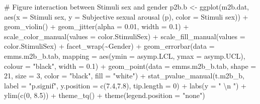 \documentclass[
  bookmarksnumbered]{article}
\newenvironment{Shaded}{\begin{snugshade}}{\end{snugshade}}
\newcommand{\AttributeTok}[1]{\textcolor[rgb]{0.80,0.80,0.80}{#1}}
\newcommand{\CommentTok}[1]{\textcolor[rgb]{0.50,0.62,0.50}{#1}}
\newcommand{\DecValTok}[1]{\textcolor[rgb]{0.86,0.86,0.80}{#1}}
\newcommand{\FloatTok}[1]{\textcolor[rgb]{0.75,0.75,0.82}{#1}}
\newcommand{\FunctionTok}[1]{\textcolor[rgb]{0.94,0.94,0.56}{#1}}
\newcommand{\NormalTok}[1]{\textcolor[rgb]{0.80,0.80,0.80}{#1}}
\newcommand{\OtherTok}[1]{\textcolor[rgb]{0.94,0.94,0.56}{#1}}
\newcommand{\SpecialCharTok}[1]{\textcolor[rgb]{0.86,0.64,0.64}{#1}}
\newcommand{\StringTok}[1]{\textcolor[rgb]{0.80,0.58,0.58}{#1}}
\begin{document}
\begin{Shaded}
\begin{Highlighting}[]
\CommentTok{\# Figure interaction between Stimuli sex and gender}
\NormalTok{p2b.b }\OtherTok{\textless{}{-}} \FunctionTok{ggplot}\NormalTok{(m2b.dat, }\FunctionTok{aes}\NormalTok{(}\AttributeTok{x =} \StringTok{\textasciigrave{}}\AttributeTok{Stimuli sex}\StringTok{\textasciigrave{}}\NormalTok{, }
                             \AttributeTok{y =} \StringTok{\textasciigrave{}}\AttributeTok{Subjective sexual arousal (p)}\StringTok{\textasciigrave{}}\NormalTok{, }
                             \AttributeTok{color =} \StringTok{\textasciigrave{}}\AttributeTok{Stimuli sex}\StringTok{\textasciigrave{}}\NormalTok{)) }\SpecialCharTok{+}
  \FunctionTok{geom\_violin}\NormalTok{() }\SpecialCharTok{+}
  \FunctionTok{geom\_jitter}\NormalTok{(}\AttributeTok{alpha =} \FloatTok{0.01}\NormalTok{, }\AttributeTok{width =} \FloatTok{0.1}\NormalTok{) }\SpecialCharTok{+}
  \FunctionTok{scale\_color\_manual}\NormalTok{(}\AttributeTok{values =}\NormalTok{ color.StimuliSex) }\SpecialCharTok{+}
  \FunctionTok{scale\_fill\_manual}\NormalTok{(}\AttributeTok{values =}\NormalTok{ color.StimuliSex) }\SpecialCharTok{+}
  \FunctionTok{facet\_wrap}\NormalTok{(}\SpecialCharTok{\textasciitilde{}}\NormalTok{Gender) }\SpecialCharTok{+}
  \FunctionTok{geom\_errorbar}\NormalTok{(}\AttributeTok{data =}\NormalTok{ emms.m2b\_b.tab, }
                \AttributeTok{mapping =} \FunctionTok{aes}\NormalTok{(}\AttributeTok{ymin =}\NormalTok{ asymp.LCL, }\AttributeTok{ymax =}\NormalTok{ asymp.UCL), }
                \AttributeTok{colour =} \StringTok{"black"}\NormalTok{, }\AttributeTok{width =} \FloatTok{0.1}\NormalTok{) }\SpecialCharTok{+}
  \FunctionTok{geom\_point}\NormalTok{(}\AttributeTok{data =}\NormalTok{ emms.m2b\_b.tab, }
             \AttributeTok{shape =} \DecValTok{21}\NormalTok{, }\AttributeTok{size =} \DecValTok{3}\NormalTok{,}
             \AttributeTok{color =} \StringTok{"black"}\NormalTok{, }\AttributeTok{fill =} \StringTok{"white"}\NormalTok{) }\SpecialCharTok{+}
  \FunctionTok{stat\_pvalue\_manual}\NormalTok{(t.m2b\_b, }
                     \AttributeTok{label =} \StringTok{"p.signif"}\NormalTok{, }
                     \AttributeTok{y.position =} \FunctionTok{c}\NormalTok{(}\FloatTok{7.4}\NormalTok{,}\FloatTok{7.8}\NormalTok{), }
                     \AttributeTok{tip.length =} \DecValTok{0}\NormalTok{) }\SpecialCharTok{+}
  \FunctionTok{labs}\NormalTok{(}\AttributeTok{y =} \StringTok{" }\SpecialCharTok{\textbackslash{}n}\StringTok{ "}\NormalTok{)  }\SpecialCharTok{+}
  \FunctionTok{ylim}\NormalTok{(}\FunctionTok{c}\NormalTok{(}\DecValTok{0}\NormalTok{, }\FloatTok{8.5}\NormalTok{)) }\SpecialCharTok{+}
  \FunctionTok{theme\_tq}\NormalTok{() }\SpecialCharTok{+}
  \FunctionTok{theme}\NormalTok{(}\AttributeTok{legend.position =} \StringTok{"none"}\NormalTok{)}


\end{Highlighting}
\end{Shaded}
\end{document}
